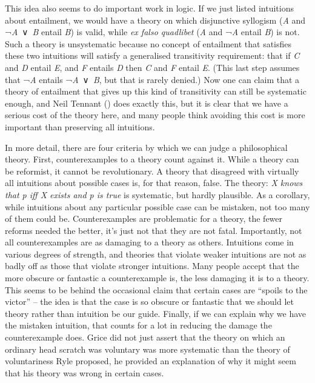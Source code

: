 \documentclass[
  11pt,
  letterpaper,
  DIV=11,
  numbers=noendperiod,
  twoside]{scrartcl}
\begin{document}
This idea also seems to do important work in logic. If we just listed
intuitions about entailment, we would have a theory on which disjunctive
syllogism (\emph{A} and ¬\emph{A}~∨~\emph{B} entail \emph{B}) is valid,
while \emph{ex falso quadlibet} (\emph{A} and ¬\emph{A} entail \emph{B})
is not. Such a theory is unsystematic because no concept of entailment
that satisfies these two intuitions will satisfy a generalised
transitivity requirement: that if \emph{C} and \emph{D} entail \emph{E},
and \emph{F} entails \emph{D} then \emph{C} and \emph{F} entail
\emph{E}. (This last step assumes that ¬\emph{A} entails
¬\emph{A}~∨~\emph{B}, but that is rarely denied.) Now one can claim that
a theory of entailment that gives up this kind of transitivity can still
be systematic enough, and Neil Tennant
() does exactly this, but it is clear
that we have a serious cost of the theory here, and many people think
avoiding this cost is more important than preserving all intuitions.

In more detail, there are four criteria by which we can judge a
philosophical theory. First, counterexamples to a theory count against
it. While a theory can be reformist, it cannot be revolutionary. A
theory that disagreed with virtually all intuitions about possible cases
is, for that reason, false. The theory: \emph{X knows that p iff X
exists and p is true} is systematic, but hardly plausible. As a
corollary, while intuitions about any particular possible case can be
mistaken, not too many of them could be. Counterexamples are problematic
for a theory, the fewer reforms needed the better, it's just not that
they are not fatal. Importantly, not all counterexamples are as damaging
to a theory as others. Intuitions come in various degrees of strength,
and theories that violate weaker intuitions are not as badly off as
those that violate stronger intuitions. Many people accept that the more
obscure or fantastic a counterexample is, the less damaging it is to a
theory. This seems to be behind the occasional claim that certain cases
are ``spoils to the victor'' -- the idea is that the case is so obscure
or fantastic that we should let theory rather than intuition be our
guide. Finally, if we can explain why we have the mistaken intuition,
that counts for a lot in reducing the damage the counterexample does.
Grice did not just assert that the theory on which an ordinary head
scratch was voluntary was more systematic than the theory of
voluntariness Ryle proposed, he provided an explanation of why it might
seem that his theory was wrong in certain cases.
\end{document}
